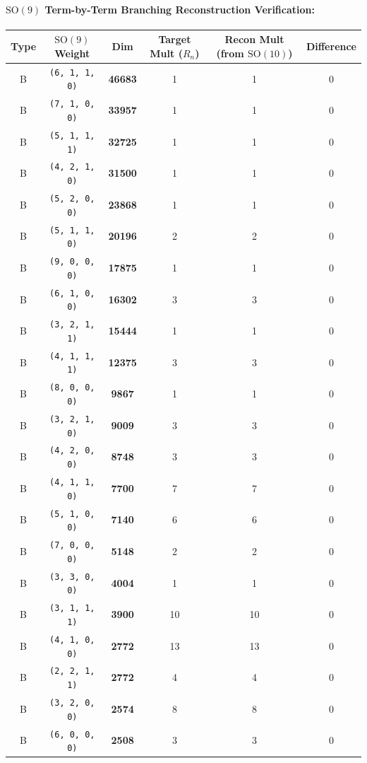 \documentclass[11pt,a4paper]{article}
\begin{document}
\paragraph{$\mathrm{SO}(9)$ Term-by-Term Branching Reconstruction Verification:}
\begin{longtable}{@{}cccccc@{}}
\toprule
Type & $\mathrm{SO}(9)$ Weight & Dim & Target Mult ($R_n$) & Recon Mult (from $\mathrm{SO}(10)$) & Difference \\
\midrule
\endhead
B & \texttt{(6, 1, 1, 0)} & \textbf{46683} & 1 & 1 & 0 \\
B & \texttt{(7, 1, 0, 0)} & \textbf{33957} & 1 & 1 & 0 \\
B & \texttt{(5, 1, 1, 1)} & \textbf{32725} & 1 & 1 & 0 \\
B & \texttt{(4, 2, 1, 0)} & \textbf{31500} & 1 & 1 & 0 \\
B & \texttt{(5, 2, 0, 0)} & \textbf{23868} & 1 & 1 & 0 \\
B & \texttt{(5, 1, 1, 0)} & \textbf{20196} & 2 & 2 & 0 \\
B & \texttt{(9, 0, 0, 0)} & \textbf{17875} & 1 & 1 & 0 \\
B & \texttt{(6, 1, 0, 0)} & \textbf{16302} & 3 & 3 & 0 \\
B & \texttt{(3, 2, 1, 1)} & \textbf{15444} & 1 & 1 & 0 \\
B & \texttt{(4, 1, 1, 1)} & \textbf{12375} & 3 & 3 & 0 \\
B & \texttt{(8, 0, 0, 0)} & \textbf{9867} & 1 & 1 & 0 \\
B & \texttt{(3, 2, 1, 0)} & \textbf{9009} & 3 & 3 & 0 \\
B & \texttt{(4, 2, 0, 0)} & \textbf{8748} & 3 & 3 & 0 \\
B & \texttt{(4, 1, 1, 0)} & \textbf{7700} & 7 & 7 & 0 \\
B & \texttt{(5, 1, 0, 0)} & \textbf{7140} & 6 & 6 & 0 \\
B & \texttt{(7, 0, 0, 0)} & \textbf{5148} & 2 & 2 & 0 \\
B & \texttt{(3, 3, 0, 0)} & \textbf{4004} & 1 & 1 & 0 \\
B & \texttt{(3, 1, 1, 1)} & \textbf{3900} & 10 & 10 & 0 \\
B & \texttt{(4, 1, 0, 0)} & \textbf{2772} & 13 & 13 & 0 \\
B & \texttt{(2, 2, 1, 1)} & \textbf{2772} & 4 & 4 & 0 \\
B & \texttt{(3, 2, 0, 0)} & \textbf{2574} & 8 & 8 & 0 \\
B & \texttt{(6, 0, 0, 0)} & \textbf{2508} & 3 & 3 & 0 \\

\end{longtable}
\end{document}
